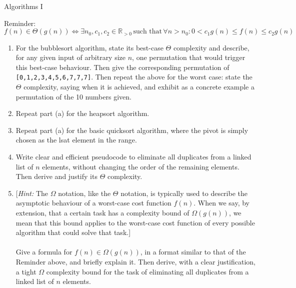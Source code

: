 \documentclass{tripos}  %
\begin{document}
\begin{question}[MockIA,year=2024,paper=1,question=7,author=tms]{Algorithms I}


  Reminder:
  \[
  f(n) \in \Theta(g(n)) \Leftrightarrow \exists n_0, c_1, c_2 \in \mathbb{R}_{>0}\, \mbox{such that}\, \forall n > n_0 : 0 < c_1g(n) \le f(n) \le c_2g(n)
  \]
  

  \begin{enumerate}
  \item For the bubblesort algorithm, state its best-case $\Theta{}$ complexity and describe, for any given input of arbitrary size $n$, one permutation that would trigger this best-case behaviour. Then give the corresponding permutation of \texttt{[0,1,2,3,4,5,6,7,7,7]}. Then repeat the above for the worst case: state the $\Theta{}$ complexity, saying when it is achieved, and exhibit as a concrete example a permutation of the 10 numbers given. 
  \item Repeat part (a) for the heapsort algorithm. 
  \item Repeat part (a) for the basic quicksort algorithm, where the pivot is simply chosen as the lsat element in the range. 
  \item Write clear and efficient pseudocode to eliminate all duplicates from a linked list of $n$ elements, without changing the order of the remaining elements. Then derive and justify its $\Theta{}$ complexity. 
  \item
    {[{\em Hint:} The $\Omega{}$ notation, like the $\Theta{}$ notation, is typically used to describe the asymptotic behaviour of a worst-case cost function $f(n)$. When we say, by extension, that a certain task has a complexity bound of $\Omega{}(g(n))$, we mean that this bound applies to the worst-case cost function of every possible algorithm that could solve that task.]}\\
    \\
    Give a formula for $f(n) \in \Omega{}(g(n))$, in a format similar to that of the Reminder above, and briefly explain it. Then derive, with a clear justification, a tight $\Omega{}$ complexity bound for the task of eliminating all duplicates from a linked list of $n$ elements. 
  \end{enumerate}

\end{question}
\end{document}
